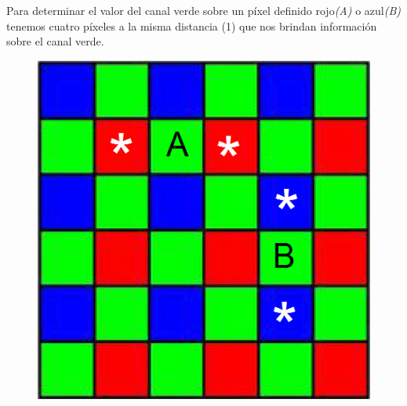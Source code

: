 \documentclass[a4paper]{article}
\begin{document}
Para determinar el valor del canal verde sobre un p\'ixel definido rojo\emph{(A)} o azul\emph{(B)} tenemos cuatro p\'ixeles a la misma distancia (1) que nos brindan informaci\'on sobre el canal verde. 
\begin{figure}[h!]
	\caption{}
	\begin{center}
	\includegraphics[scale=0.36]{imagenes/vecino2}
	\label{Vecino2}
  \end{center}
\end{figure}
\end{document}
